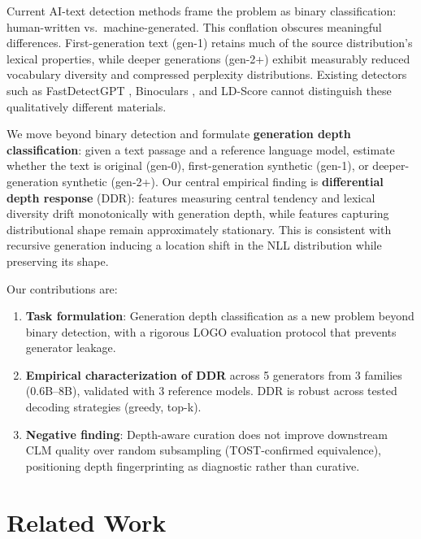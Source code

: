 \documentclass[11pt,a4paper]{article}
\begin{document}
Current AI-text detection methods frame the problem as binary classification: human-written vs.\ machine-generated. This conflation obscures meaningful differences. First-generation text (gen-1) retains much of the source distribution's lexical properties, while deeper generations (gen-2+) exhibit measurably reduced vocabulary diversity and compressed perplexity distributions. Existing detectors such as FastDetectGPT \cite{bao2024fast}, Binoculars \cite{hans2024binoculars}, and LD-Score cannot distinguish these qualitatively different materials.

We move beyond binary detection and formulate \textbf{generation depth classification}: given a text passage and a reference language model, estimate whether the text is original (gen-0), first-generation synthetic (gen-1), or deeper-generation synthetic (gen-2+). Our central empirical finding is \textbf{differential depth response} (DDR): features measuring central tendency and lexical diversity drift monotonically with generation depth, while features capturing distributional shape remain approximately stationary. This is consistent with recursive generation inducing a location shift in the NLL distribution while preserving its shape.

Our contributions are:
\begin{enumerate}[nosep,leftmargin=*]
\item \textbf{Task formulation}: Generation depth classification as a new problem beyond binary detection, with a rigorous LOGO evaluation protocol that prevents generator leakage.
\item \textbf{Empirical characterization of DDR} across 5 generators from 3 families (0.6B--8B), validated with 3 reference models. DDR is robust across tested decoding strategies (greedy, top-k).
\item \textbf{Negative finding}: Depth-aware curation does not improve downstream CLM quality over random subsampling (TOST-confirmed equivalence), positioning depth fingerprinting as diagnostic rather than curative.
\end{enumerate}

\section{Related Work}
\label{sec:related}
\end{document}
